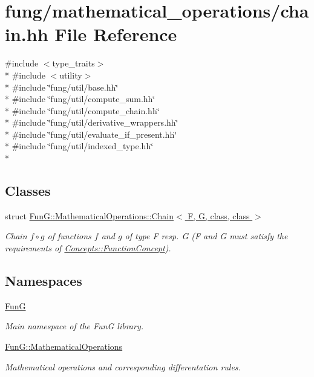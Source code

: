 \hypertarget{chain_8hh}{}\section{fung/mathematical\+\_\+operations/chain.hh File Reference}
\label{chain_8hh}
{\ttfamily \#include $<$type\+\_\+traits$>$}\\*
{\ttfamily \#include $<$utility$>$}\\*
{\ttfamily \#include \char`\"{}fung/util/base.\+hh\char`\"{}}\\*
{\ttfamily \#include \char`\"{}fung/util/compute\+\_\+sum.\+hh\char`\"{}}\\*
{\ttfamily \#include \char`\"{}fung/util/compute\+\_\+chain.\+hh\char`\"{}}\\*
{\ttfamily \#include \char`\"{}fung/util/derivative\+\_\+wrappers.\+hh\char`\"{}}\\*
{\ttfamily \#include \char`\"{}fung/util/evaluate\+\_\+if\+\_\+present.\+hh\char`\"{}}\\*
{\ttfamily \#include \char`\"{}fung/util/indexed\+\_\+type.\+hh\char`\"{}}\\*
\subsection*{Classes}
\begin{DoxyCompactItemize}
\item 
struct \hyperlink{structFunG_1_1MathematicalOperations_1_1Chain}{Fun\+G\+::\+Mathematical\+Operations\+::\+Chain$<$ F, G, class, class $>$}
\begin{DoxyCompactList}\small\item\em Chain $ f\circ g $ of functions $f$ and $g$ of type F resp. G (F and G must satisfy the requirements of \hyperlink{structFunG_1_1Concepts_1_1FunctionConcept}{Concepts\+::\+Function\+Concept}). \end{DoxyCompactList}\end{DoxyCompactItemize}
\subsection*{Namespaces}
\begin{DoxyCompactItemize}
\item 
 \hyperlink{namespaceFunG}{Fun\+G}
\begin{DoxyCompactList}\small\item\em Main namespace of the Fun\+G library. \end{DoxyCompactList}\item 
 \hyperlink{namespaceFunG_1_1MathematicalOperations}{Fun\+G\+::\+Mathematical\+Operations}
\begin{DoxyCompactList}\small\item\em Mathematical operations and corresponding differentation rules. \end{DoxyCompactList}\end{DoxyCompactItemize}
